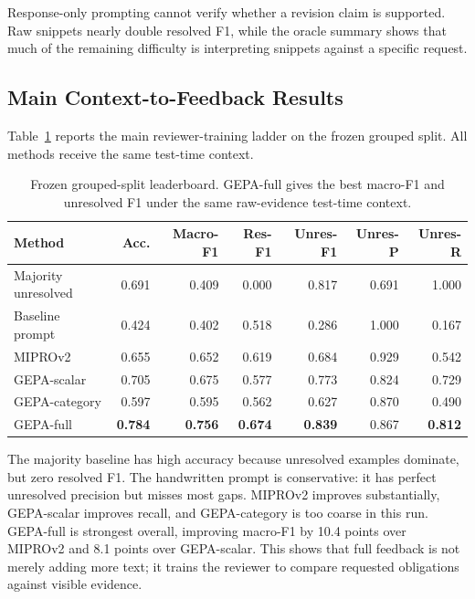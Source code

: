 \documentclass[11pt]{article}
\begin{document}
Response-only prompting cannot verify whether a revision claim is supported. Raw snippets nearly double resolved F1, while the oracle summary shows that much of the remaining difficulty is interpreting snippets against a specific request.

\subsection{Main Context-to-Feedback Results}

Table~\ref{tab:leaderboard} reports the main reviewer-training ladder on the frozen grouped split. All methods receive the same test-time context.

\begin{table}[t]
\centering
\small
\begin{tabular}{lrrrrrr}
\toprule
\textbf{Method} & \textbf{Acc.} & \textbf{Macro-F1} & \textbf{Res-F1} & \textbf{Unres-F1} & \textbf{Unres-P} & \textbf{Unres-R} \\
\midrule
Majority unresolved & 0.691 & 0.409 & 0.000 & 0.817 & 0.691 & 1.000 \\
Baseline prompt & 0.424 & 0.402 & 0.518 & 0.286 & 1.000 & 0.167 \\
MIPROv2 & 0.655 & 0.652 & 0.619 & 0.684 & 0.929 & 0.542 \\
GEPA-scalar & 0.705 & 0.675 & 0.577 & 0.773 & 0.824 & 0.729 \\
GEPA-category & 0.597 & 0.595 & 0.562 & 0.627 & 0.870 & 0.490 \\
GEPA-full & \textbf{0.784} & \textbf{0.756} & \textbf{0.674} & \textbf{0.839} & 0.867 & \textbf{0.812} \\
\bottomrule
\end{tabular}
\caption{Frozen grouped-split leaderboard. GEPA-full gives the best macro-F1 and unresolved F1 under the same raw-evidence test-time context.}
\label{tab:leaderboard}
\end{table}

The majority baseline has high accuracy because unresolved examples dominate, but zero resolved F1. The handwritten prompt is conservative: it has perfect unresolved precision but misses most gaps. MIPROv2 improves substantially, GEPA-scalar improves recall, and GEPA-category is too coarse in this run. GEPA-full is strongest overall, improving macro-F1 by 10.4 points over MIPROv2 and 8.1 points over GEPA-scalar. This shows that full feedback is not merely adding more text; it trains the reviewer to compare requested obligations against visible evidence.
\end{document}
